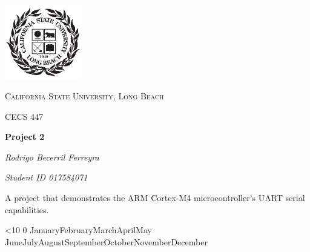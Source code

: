 \documentclass{article}
\renewcommand{\today}{\ifnum\number\day<10 0\fi \number\day \space%
\ifcase \month \or January\or February\or March\or April\or May%
\or June\or July\or August\or September\or October\or November\or December\fi\space%
\number \year}
\begin{document}
\begin{titlepage}
	\centering
	\includegraphics[width=0.25\textwidth]{Images/247px-CSU-Longbeach_seal}\par\vspace{1cm}
	{\scshape\Large California State University, Long Beach \par}
	\vspace{1cm}
	{\scshape\Large CECS 447\par}
	\vspace{1.5cm}
	{\huge\bfseries Project 2\par}
	\vspace{2cm}
    {\Large\itshape Rodrigo Becerril Ferreyra\par}
    {\itshape\Large Student ID 017584071 \par}
	\vfill
    A project that demonstrates the ARM Cortex-M4
	microcontroller's UART serial capabilities.

	\vfill

	{\large \today\par}
\end{titlepage}
\end{document}
